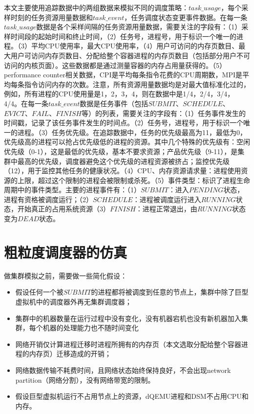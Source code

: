 本文主要使用追踪数据中的两组数据来模拟不同的调度策略：$task\_usage$，每个采样时刻的任务资源用量数据和$task\_event$，任务调度状态变更事件数据。在每一条$task\_usage$数据是各个采样间隔的任务资源用量数据，需要关注的字段有：（1）采样时间段的起始时间和终止时间，（2）任务号，进程号，用于标识一个唯一的进程。（3）平均CPU使用率，最大CPU使用率，（4）用户可访问的内存页数目、最大用户可访问内存页数目、分配给整个容器进程的内存页数目（包括部分用户不可访问的内核页面）。这些数据都是通过测量容器的内存占用量获得的。（5）performance counter相关数据，CPI是平均每条指令花费的CPU周期数，MPI是平均每条指令访问内存的次数。注意，所有资源用量数据均是对最大值标准化过的，例如，所有进程的CPU使用量是1，2，3，4，则在数据中是1/4，2/4，3/4，4/4。在每一条$task\_event$数据是任务事件（包括$SUBMIT$、$SCHEDULE$、$EVICT$、$FAIL$、$FINISH$等）的列表，需要关注的字段有：（1）任务事件发生的时间戳，记录了该任务事件发生的时间点。（2）任务号，进程号，用于标识一个唯一的进程。（3）任务优先级。在追踪数据中，任务的优先级最高为11，最低为0，优先级高的进程可以抢占优先级低的进程的资源。其中几个特殊的优先级有：空闲优先级（0-1），这是最低的优先级，基本不要求资源；产品优先级（9-11），是集群中最高的优先级，调度器避免这个优先级的进程资源被挤占；监控优先级（12），用于监控其他任务的健康状况。（4）CPU、内存资源请求量：进程使用资源的上限，超过这个限制的进程会被限制或杀死。（5）事件类型：标识了进程生命周期中的事件类型。主要的进程事件有：（1）$SUBMIT$：进入$PENDING$状态，进程有资格被调度运行；（2）$SCHEDULE$：进程被调度运行进入$RUNNING$状态，开始真正的占用系统资源（3）$FINISH$：进程正常退出，由$RUNNING$状态变为$DEAD$状态。

\section{粗粒度调度器的仿真}
做集群模拟之前，需要做一些简化假设：
\begin{itemize}
  \item 假设任何一个被$SUBMIT$的进程都将被调度到任意的节点上，集群中除了巨型虚拟机中的调度器外再无集群调度器；
  \item 集群中的机器数量在运行过程中没有变化，没有机器宕机也没有新机器加入集群，每个机器的处理能力也不随时间变化
  \item 网络开销仅计算进程迁移时进程所拥有的内存页（本文选取分配给整个容器进程的内存页）迁移造成的开销；
  \item 网络数据传输不耗费时间，且网络状态始终保持良好，不会出现network partition（网络分割），没有网络带宽的限制。
  \item 假设巨型虚拟机运行不占用节点上的资源，dQEMU进程和DSM不占用CPU和内存。
\end{itemize}

